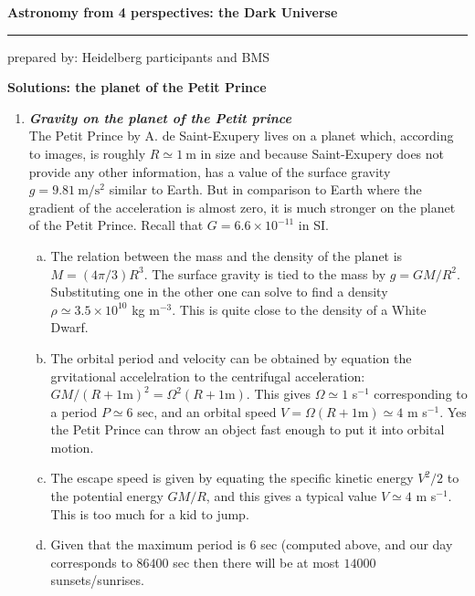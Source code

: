 \documentclass[a4paper,12pt]{article}
\newcommand{\question}[1]{\textbf{\textit{#1}}}
\newcommand{\HRule}{\rule{\linewidth}{0.3mm}}
\begin{document}
\pagestyle{empty}

\begin{center}
\LARGE \textbf{Astronomy from 4 perspectives: the Dark Universe}
\HRule
\end{center}
\begin{flushright}
prepared by: Heidelberg participants and BMS
\end{flushright}
\begin{center}
{\Large \textbf{Solutions: the planet of the Petit Prince}}
\end{center}
\vspace{5mm}

\begin{enumerate}

\item \question{Gravity on the planet of the Petit prince}\\
The Petit Prince by A. de Saint-Exupery lives on a planet which,
according to images, is roughly $R\simeq 1~\mathrm{m}$ in size and
because Saint-Exupery does not provide any other information, has a
value of the surface gravity $g=9.81~\mathrm{m}/\mathrm{s}^2$ similar
to Earth. But in comparison to Earth where the gradient of the
acceleration is almost zero, it is much stronger on the planet of the
Petit Prince. Recall that $G=6.6\times 10^{-11}$ in SI.
\begin{enumerate}[(a)]
\item{The relation between the mass and the density of the planet is
    $M=(4\pi /3)R^3$. The surface gravity is tied to the mass by
    $g=GM/R^2$. Substituting one in the other one can solve to find a
    density $\rho \simeq 3.5\times 10^{10}$ kg m$^{-3}$. This is quite
  close to the density of a White Dwarf.}
\item{The orbital period and velocity can be obtained by equation the
    grvitational accelelration to the centrifugal acceleration:
    $GM/(R+1\mathrm{m})^2 = \Omega^2 (R+1\mathrm{m}) $. This gives
    $\Omega \simeq 1$ s$^{-1}$ corresponding to a period $P\simeq 6$ sec, and
    an orbital speed $V=\Omega (R+1\mathrm{m})\simeq 4$ m
    s$^{-1}$. Yes the Petit Prince can throw an object fast enough to
    put it into orbital motion.}
\item{The escape speed is given by equating the specific kinetic
    energy $V^2/2$ to the potential energy $GM/R$, and this gives a
    typical value $V\simeq 4$ m
    s$^{-1}$. This is too much for a kid to jump.}
\item{Given that the maximum period is 6 sec (computed above, and our
    day corresponds to $86400$ sec then
    there will be at most $14000$ sunsets/sunrises.}
\end{enumerate}


\end{enumerate}
\end{document}
